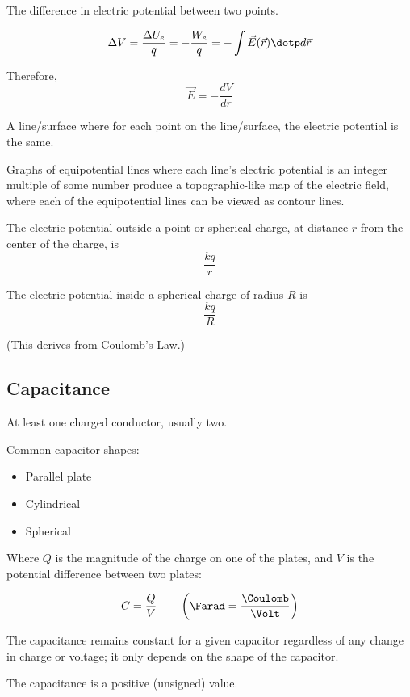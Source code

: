 \begin{definition}
  The difference in electric potential between two points.

  \[
    \Delta V = \frac{\Delta U_e}{q} = -\frac{W_e}{q} = -\int \vec{E}(\vec{r}) \dotp d\vec{r} 
  \]

  Therefore,
  \[
    \vec{E} = - \frac{dV}{dr}
  \]
\end{definition}

\begin{definition}
  A line/surface where for each point on the line/surface, the electric potential is the same.
  
  Graphs of equipotential lines where each line's electric potential is an integer multiple of some number produce a topographic-like map of the electric field, where each of the equipotential lines can be viewed as contour lines.
\end{definition}

\begin{theorem}
  The electric potential outside a point or spherical charge, at distance $r$ from the center of the charge, is
  \[
    \frac{kq}{r}
  \]

  The electric potential inside a spherical charge of radius $R$ is
  \[
    \frac{kq}{R}
  \]

  (This derives from Coulomb's Law.)
\end{theorem}

\subsection{Capacitance}

\begin{definition}[Capacitor]
  At least one charged conductor, usually two.

  Common capacitor shapes:
  \begin{itemize}
    \item Parallel plate
    \item Cylindrical
    \item Spherical
  \end{itemize}
\end{definition}

\begin{definition}[Capacitance]
  Where $Q$ is the magnitude of the charge on one of the plates, and $V$ is the potential difference between two plates:

  \[
    C = \frac{Q}{V} \qquad \left(\Farad = \frac{\Coulomb}{\Volt}\right)
  \]

  The capacitance remains constant for a given capacitor regardless of any change in charge or voltage; it only depends on the shape of the capacitor.

  The capacitance is a positive (unsigned) value.
\end{definition}


